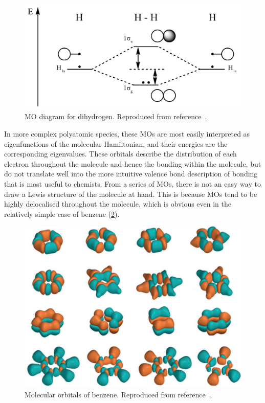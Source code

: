 \begin{refsection}
\begin{figure}
    \includegraphics[width=0.6\linewidth]{Figures/h-orbital-diagram.pdf}
    \caption[MO diagram for dihydrogen.]{MO diagram for dihydrogen. Reproduced from reference~\cite{h-orbital-diagram}.}\label{fig:h-orbital-diagram}
\end{figure}

In more complex polyatomic species, these MOs are most easily interpreted as eigenfunctions of the molecular Hamiltonian, and their energies are the corresponding eigenvalues. 
These orbitals describe the distribution of each electron throughout the molecule and hence the bonding within the molecule, but do not translate well into the more intuitive valence bond description of bonding that is most useful to chemists.
From a series of MOs, there is not an easy way to draw a Lewis structure of the molecule at hand.
This is because MOs tend to be highly delocalised throughout the molecule, which is obvious even in the relatively simple case of benzene (\cref{fig:benzene-mo}).

\begin{figure}
    \includegraphics[width=0.8\linewidth]{Figures/benzene-mo.pdf}
    \caption[Molecular orbitals of benzene.]{Molecular orbitals of benzene. Reproduced from reference~\cite{Luhmann2015}.}\label{fig:benzene-mo}
\end{figure}


\end{refsection}
